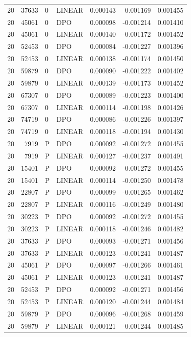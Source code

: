 \begin{longtable}{rrllrrr}
20 & 37633 & 0 & LINEAR & 0.000143 & -0.001169 & 0.001455\\
20 & 45061 & 0 & DPO & 0.000098 & -0.001214 & 0.001410\\
20 & 45061 & 0 & LINEAR & 0.000140 & -0.001172 & 0.001452\\
20 & 52453 & 0 & DPO & 0.000084 & -0.001227 & 0.001396\\
20 & 52453 & 0 & LINEAR & 0.000138 & -0.001174 & 0.001450\\
20 & 59879 & 0 & DPO & 0.000090 & -0.001222 & 0.001402\\
20 & 59879 & 0 & LINEAR & 0.000139 & -0.001173 & 0.001452\\
20 & 67307 & 0 & DPO & 0.000089 & -0.001223 & 0.001400\\
20 & 67307 & 0 & LINEAR & 0.000114 & -0.001198 & 0.001426\\
20 & 74719 & 0 & DPO & 0.000086 & -0.001226 & 0.001397\\
20 & 74719 & 0 & LINEAR & 0.000118 & -0.001194 & 0.001430\\
20 & 7919 & P & DPO & 0.000092 & -0.001272 & 0.001455\\
20 & 7919 & P & LINEAR & 0.000127 & -0.001237 & 0.001491\\
20 & 15401 & P & DPO & 0.000092 & -0.001272 & 0.001455\\
20 & 15401 & P & LINEAR & 0.000114 & -0.001250 & 0.001478\\
20 & 22807 & P & DPO & 0.000099 & -0.001265 & 0.001462\\
20 & 22807 & P & LINEAR & 0.000116 & -0.001249 & 0.001480\\
20 & 30223 & P & DPO & 0.000092 & -0.001272 & 0.001455\\
20 & 30223 & P & LINEAR & 0.000118 & -0.001246 & 0.001482\\
20 & 37633 & P & DPO & 0.000093 & -0.001271 & 0.001456\\
20 & 37633 & P & LINEAR & 0.000123 & -0.001241 & 0.001487\\
20 & 45061 & P & DPO & 0.000097 & -0.001266 & 0.001461\\
20 & 45061 & P & LINEAR & 0.000123 & -0.001241 & 0.001487\\
20 & 52453 & P & DPO & 0.000092 & -0.001271 & 0.001456\\
20 & 52453 & P & LINEAR & 0.000120 & -0.001244 & 0.001484\\
20 & 59879 & P & DPO & 0.000096 & -0.001268 & 0.001459\\
20 & 59879 & P & LINEAR & 0.000121 & -0.001244 & 0.001485\\

\end{longtable}
